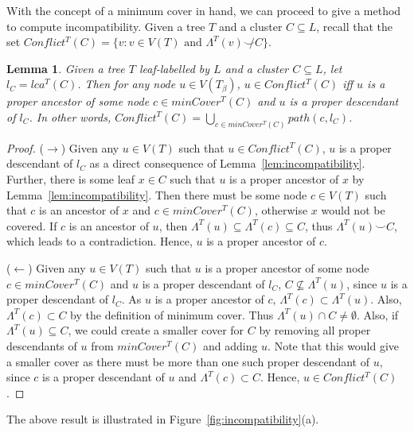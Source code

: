 \documentclass[final,1p,times]{elsarticle}
\newcommand{\compatible}{\smile}
\newcommand{\leafset}{\Lambda}
\newcommand{\TB}{T_\beta}
\newtheorem{lemma}[theorem]{Lemma}
\begin{document}
    With the concept of a minimum cover in hand, we can proceed to give a method to compute incompatibility. Given a tree $T$ and a cluster $C \subseteq L$, recall that the set $Conflict^{T}(C) = \{v : v \in V(T) \text{ and } \leafset^{T}(v) \not\compatible C\}$.
    \newline

    \begin{lemma}
        \label{lem:incompatibilitymincover}
        Given a tree $T$ leaf-labelled by $L$ and a cluster $C \subseteq L$, let $l_C = lca^{T}(C)$. Then for any node $u \in V(\TB)$, $u \in Conflict^{T}(C)$ iff $u$ is a proper ancestor of some node $c \in minCover^{T}(C)$ and $u$ is a proper descendant of $l_C$. In other words, $Conflict^{T}(C) = \bigcup_{c \in minCover^{T}(C)} path(c, l_C)$.
    \end{lemma}
        \begin{proof}
		($\longrightarrow$) Given any $u \in V(T)$ such that $u \in Conflict^{T}(C)$, $u$ is a proper descendant of $l_C$ as a direct consequence of Lemma~\ref{lem:incompatibility}. Further, there is some leaf $x \in C$ such that $u$ is a proper ancestor of $x$ by Lemma~\ref{lem:incompatibility}. Then there must be some node $c \in V(T)$ such that $c$ is an ancestor of $x$ and $c \in minCover^{T}(C)$, otherwise $x$ would not be covered. If $c$ is an ancestor of $u$, then $\leafset^{T}(u) \subseteq \leafset^{T}(c) \subseteq C$, thus $\leafset^{T}(u) \compatible C$, which leads to a contradiction. Hence, $u$ is a proper ancestor of $c$.

		($\longleftarrow$) Given any $u \in V(T)$ such that $u$ is a proper ancestor of some node $c \in minCover^{T}(C)$ and $u$ is a proper descendant of $l_C$, $C \not\subseteq \leafset^{T}(u)$, since $u$ is a proper descendant of $l_C$. As $u$ is a proper ancestor of $c$, $\leafset^{T}(c) \subset \leafset^{T}(u)$. Also, $\leafset^{T}(c) \subset C$ by the definition of minimum cover. Thus $\leafset^{T}(u) \cap C \neq \emptyset$. Also, if $\leafset^{T}(u) \subseteq C$, we could create a smaller cover for $C$ by removing all proper descendants of $u$ from $minCover^{T}(C)$ and adding $u$. Note that this would give a smaller cover as there must be more than one such proper descendant of $u$, since $c$ is a proper descendant of $u$ and $\leafset^{T}(c) \subset C$. Hence, $u \in Conflict^{T}(C)$.
        \end{proof}

    The above result is illustrated in Figure~\ref{fig:incompatibility}(a).
\end{document}
